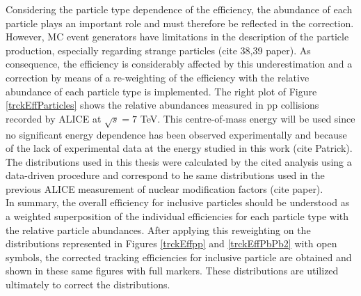 \documentclass[12pt,a4paper]{report}
\begin{document}
Considering the particle type dependence of the efficiency, the abundance of each particle plays an important role and must therefore be reflected in the correction. However, MC event generators have limitations in the description of the particle production, especially regarding strange particles (cite 38,39 paper). As consequence, the efficiency is considerably affected by this underestimation and a correction by means of a re-weighting of the efficiency with the relative abundance of each particle type is implemented. The right plot of Figure \ref{trckEffParticles} shows the relative abundances measured in pp collisions recorded by ALICE at $\sqrt{s} = 7$ TeV. This centre-of-mass energy will be used since no significant energy dependence has been observed experimentally and because of the lack of experimental data at the energy studied in this work (cite Patrick). The distributions used in this thesis were calculated by the cited analysis using a data-driven procedure and correspond to he same distributions used in the previous ALICE measurement of nuclear modification factors (cite paper).\\
In summary, the overall efficiency for inclusive particles should be understood as a weighted superposition of the individual efficiencies for each particle type with the relative particle abundances. After applying this reweighting on the distributions represented in Figures \ref{trckEffpp} and \ref{trckEffPbPb2} with open symbols, the corrected tracking efficiencies for inclusive particle are obtained and shown in these same figures with full markers. These distributions are utilized ultimately to correct the \pt distributions. 
\end{document}
